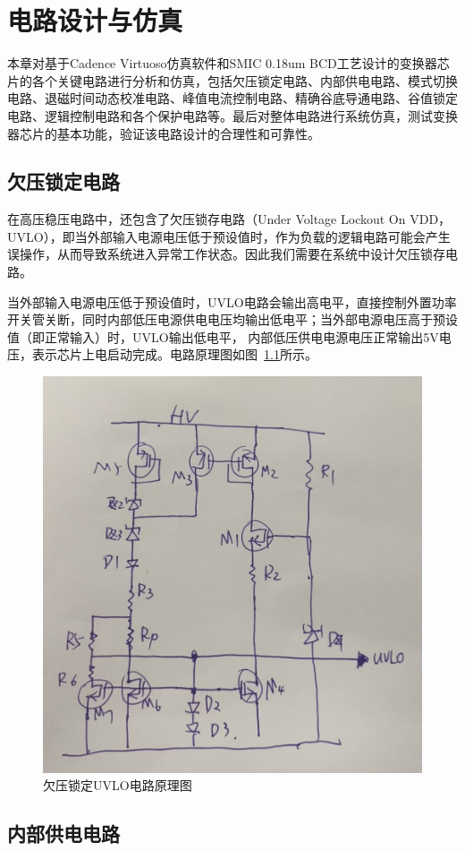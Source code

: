 \chapter{电路设计与仿真}

本章对基于Cadence Virtuoso仿真软件和SMIC 0.18um BCD工艺设计的变换器芯片的各个关键电路进行分析和仿真，包括欠压锁定电路、内部供电电路、模式切换电路、退磁时间动态校准电路、峰值电流控制电路、精确谷底导通电路、谷值锁定电路、逻辑控制电路和各个保护电路等。最后对整体电路进行系统仿真，测试变换器芯片的基本功能，验证该电路设计的合理性和可靠性。

\section{欠压锁定电路}

在高压稳压电路中，还包含了欠压锁存电路（Under Voltage Lockout On VDD， UVLO），即当外部输入电源电压低于预设值时，作为负载的逻辑电路可能会产生误操作，从而导致系统进入异常工作状态。因此我们需要在系统中设计欠压锁存电路。

当外部输入电源电压低于预设值时，UVLO电路会输出高电平，直接控制外置功率开关管关断，同时内部低压电源供电电压均输出低电平；当外部电源电压高于预设值（即正常输入）时，UVLO输出低电平， 内部低压供电电源电压正常输出5V电压，表示芯片上电启动完成。电路原理图如图~\ref{fig:UVLO电路}所示。

\begin{figure}[htbp] 
    \centering
    \includegraphics[width=0.6\linewidth]{figures/UVLO电路.jpg}
    \caption{欠压锁定UVLO电路原理图}
    \label{fig:UVLO电路}
\end{figure}


\section{内部供电电路}

